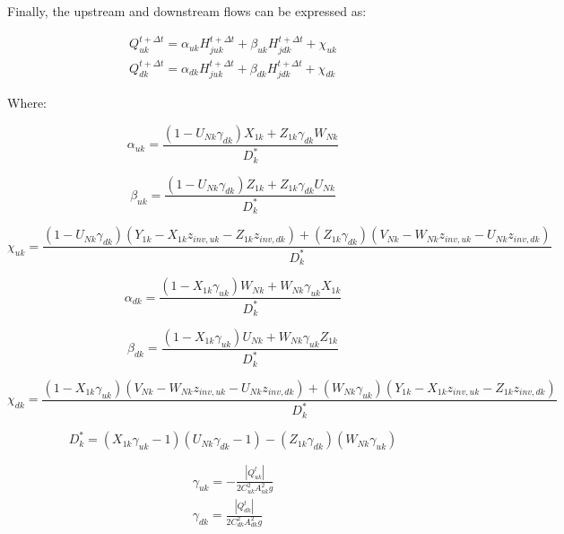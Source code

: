 \documentclass[11pt]{article}
\begin{document}
Finally, the upstream and downstream flows can be expressed as:

\begin{align}
 Q_{uk}^{t + \Delta t} = \alpha_{uk} H_{juk}^{t + \Delta t} + \beta_{uk} H_{jdk}^{t + \Delta t} + \chi_{uk} \\ 
 Q_{dk}^{t + \Delta t} = \alpha_{dk} H_{juk}^{t + \Delta t} + \beta_{dk} H_{jdk}^{t + \Delta t} + \chi_{dk} 
\end{align}

Where:

\begin{equation}
  \alpha_{uk} = \frac{(1 - U_{Nk} \gamma_{dk}) X_{1k} + Z_{1k} \gamma_{dk} W_{Nk}}{D_k^*}
\end{equation}

\begin{equation}
  \beta_{uk} = \frac{(1 - U_{Nk} \gamma_{dk}) Z_{1k} + Z_{1k} \gamma_{dk} U_{Nk}}{D_k^*}
\end{equation}

\begin{equation}
  \chi_{uk} = \frac{(1 - U_{Nk} \gamma_{dk})(Y_{1k} - X_{1k} z_{inv, uk} - Z_{1k} z_{inv, dk})  + (Z_{1k} \gamma_{dk})(V_{Nk} - W_{Nk} z_{inv, uk} - U_{Nk} z_{inv, dk})}{D_k^*}
\end{equation}

\begin{equation}
  \alpha_{dk} = \frac{(1 - X_{1k} \gamma_{uk}) W_{Nk} + W_{Nk} \gamma_{uk} X_{1k}}{D_k^*}
\end{equation}

\begin{equation}
  \beta_{dk} = \frac{(1 - X_{1k} \gamma_{uk}) U_{Nk} + W_{Nk} \gamma_{uk} Z_{1k}}{D_k^*}
\end{equation}

\begin{equation}
  \chi_{dk} = \frac{(1 - X_{1k} \gamma_{uk})(V_{Nk} - W_{Nk} z_{inv, uk} - U_{Nk} z_{inv, dk})  + (W_{Nk} \gamma_{uk})(Y_{1k} - X_{1k} z_{inv, uk} - Z_{1k} z_{inv, dk})}{D_k^*}
\end{equation}

\begin{equation}
  D_k^* = (X_{1k} \gamma_{uk} - 1)(U_{Nk} \gamma_{dk} - 1) - (Z_{1k} \gamma_{dk})(W_{Nk} \gamma_{uk})
\end{equation}

\begin{align}
  \gamma_{uk} = -\frac{|Q_{uk}^{t}|}{2 C_{uk}^2 A_{uk}^2 g} \\
  \gamma_{dk} = \frac{|Q_{dk}^{t}|}{2 C_{dk}^2 A_{dk}^2 g}
\end{align}
\end{document}
